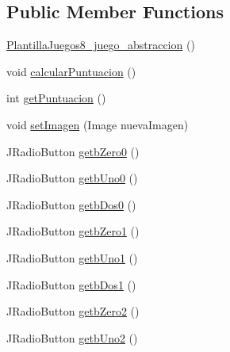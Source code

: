 \subsection*{Public Member Functions}
\begin{DoxyCompactItemize}
\item 
\mbox{\hyperlink{classdiagnostico_1_1_plantilla_juegos8__juego__abstraccion_a5ab895177cd4d2aba205385257098ec0}{Plantilla\+Juegos8\+\_\+juego\+\_\+abstraccion}} ()
\item 
void \mbox{\hyperlink{classdiagnostico_1_1_plantilla_juegos8__juego__abstraccion_af147e0e4e52d58d1f9b1868775dc5a6f}{calcular\+Puntuacion}} ()
\item 
int \mbox{\hyperlink{classdiagnostico_1_1_plantilla_juegos8__juego__abstraccion_aaca8f5222992e11b0531737a85bc2b11}{get\+Puntuacion}} ()
\item 
void \mbox{\hyperlink{classdiagnostico_1_1_plantilla_juegos8__juego__abstraccion_a0fe0783862246c141162ff5d911ad959}{set\+Imagen}} (Image nueva\+Imagen)
\item 
J\+Radio\+Button \mbox{\hyperlink{classdiagnostico_1_1_plantilla_juegos8__juego__abstraccion_a46a67b839b3e319ba27f8e1db6dae3f3}{getb\+Zero0}} ()
\item 
J\+Radio\+Button \mbox{\hyperlink{classdiagnostico_1_1_plantilla_juegos8__juego__abstraccion_a5221084a76ed04175621a8d191580022}{getb\+Uno0}} ()
\item 
J\+Radio\+Button \mbox{\hyperlink{classdiagnostico_1_1_plantilla_juegos8__juego__abstraccion_a384229709533e0fc037ffaaedd40397d}{getb\+Dos0}} ()
\item 
J\+Radio\+Button \mbox{\hyperlink{classdiagnostico_1_1_plantilla_juegos8__juego__abstraccion_a5de894633668394812efeaa80f53ba5e}{getb\+Zero1}} ()
\item 
J\+Radio\+Button \mbox{\hyperlink{classdiagnostico_1_1_plantilla_juegos8__juego__abstraccion_a2f1894cb0f9367532d9916bd2a8fbca3}{getb\+Uno1}} ()
\item 
J\+Radio\+Button \mbox{\hyperlink{classdiagnostico_1_1_plantilla_juegos8__juego__abstraccion_a5151d9fdef8f9e06d103e7d350c206e4}{getb\+Dos1}} ()
\item 
J\+Radio\+Button \mbox{\hyperlink{classdiagnostico_1_1_plantilla_juegos8__juego__abstraccion_a7db106245d57c221f2025549bc70085f}{getb\+Zero2}} ()
\item 
J\+Radio\+Button \mbox{\hyperlink{classdiagnostico_1_1_plantilla_juegos8__juego__abstraccion_a7fc3b90527f3d69bd85228b422c819c8}{getb\+Uno2}} ()
\item 

\end{DoxyCompactItemize}
